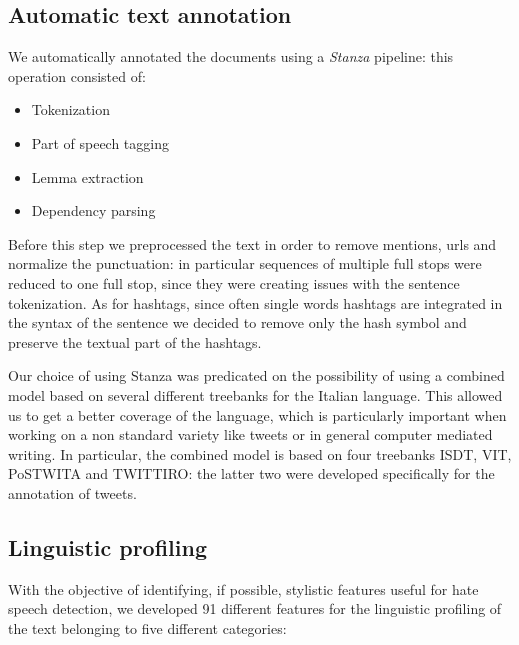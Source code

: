 \subsection{Automatic text annotation}
We automatically annotated the documents using a \emph{Stanza} \cite{stanza} pipeline: this operation consisted of:
\begin{itemize}
    \item Tokenization
    \item Part of speech tagging
    \item Lemma extraction
    \item Dependency parsing
\end{itemize}

Before this step we preprocessed the text in order to remove mentions, urls and normalize the punctuation: in particular sequences of multiple full stops were reduced to one full stop, since they were creating issues with the sentence tokenization.
As for hashtags, since often single words hashtags are integrated in the syntax of the sentence we decided to remove only the hash symbol and preserve the textual part of the hashtags.

Our choice of using Stanza was predicated on the possibility of using a combined model based on several different treebanks for the Italian language.
This allowed us to get a better coverage of the language, which is particularly important when working on a non standard variety like tweets or in general computer mediated writing.
In particular, the combined model is based on four treebanks ISDT, VIT, PoSTWITA and TWITTIRO: the latter two were developed specifically for the annotation of tweets.

\subsection{Linguistic profiling}
With the objective of identifying, if possible, stylistic features useful for hate speech detection, we developed 91 different features for the linguistic profiling of the text belonging to five different categories:


